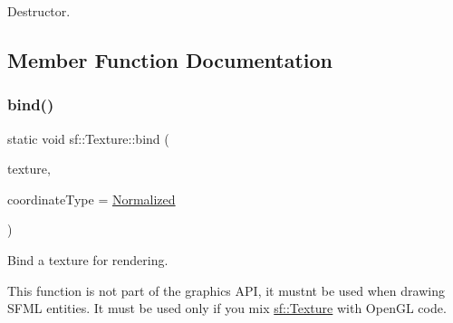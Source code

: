 Destructor. 

\begin{DoxyVerb}\end{DoxyVerb}
 

\subsection{Member Function Documentation}
\mbox{\label{classsf_1_1_texture_ae9a4274e7b95ebf7244d09c7445833b0}} 
\subsubsection{\texorpdfstring{bind()}{bind()}}
{\footnotesize\ttfamily static void sf\+::\+Texture\+::bind (\begin{DoxyParamCaption}\item[{const \mbox{\hyperlink{classsf_1_1_texture}{Texture}} $\ast$}]{texture,  }\item[{\mbox{\hyperlink{classsf_1_1_texture_aa6fd3bbe3c334b3c4428edfb2765a82e}{Coordinate\+Type}}}]{coordinate\+Type = {\ttfamily \mbox{\hyperlink{classsf_1_1_texture_aa6fd3bbe3c334b3c4428edfb2765a82ea69d6228950882e4d68be4ba4dbe7df73}{Normalized}}} }\end{DoxyParamCaption})\hspace{0.3cm}{\ttfamily [static]}}



Bind a texture for rendering. 

This function is not part of the graphics A\+PI, it mustn\textquotesingle{}t be used when drawing S\+F\+ML entities. It must be used only if you mix \mbox{\hyperlink{classsf_1_1_texture}{sf\+::\+Texture}} with Open\+GL code.


\begin{DoxyCode}{0}
\DoxyCodeLine{\textcolor{comment}{// draw OpenGL stuff that use t1...}}
\DoxyCodeLine{\textcolor{comment}{// draw OpenGL stuff that use t2...}}
\DoxyCodeLine{\textcolor{comment}{// draw OpenGL stuff that use no texture...}}
\end{DoxyCode}


